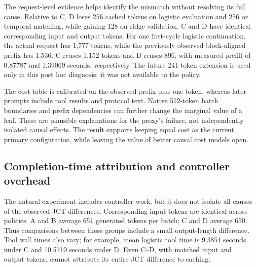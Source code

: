 \documentclass[sigconf, screen, review, balance=false]{acmart}
\begin{document}
The request-level evidence helps identify the mismatch without resolving
its full cause. Relative to C, D loses 256 cached tokens on logistic
evaluation and 256 on temporal matching, while gaining 128 on ridge
validation. C and D have identical corresponding input and output
tokens. For one first-cycle logistic continuation, the actual request
has 1,777 tokens, while the previously observed block-aligned prefix has
1,536. C reuses 1,152 tokens and D reuses 896, with measured prefill of
0.87787 and 1.39069 seconds, respectively. The future 241-token
extension is used only in this post hoc diagnosis; it was not available
to the policy.

The cost table is calibrated on the observed prefix plus one token,
whereas later prompts include tool results and protocol text. Native
512-token batch boundaries and prefix dependencies can further change
the marginal value of a leaf. These are plausible explanations for the
proxy's failure, not independently isolated causal effects. The result
supports keeping equal cost as the current primary configuration, while
leaving the value of better causal cost models open.

\subsection{Completion-time attribution and controller
overhead}\label{completion-time-attribution-and-controller-overhead}

The natural experiment includes controller work, but it does not isolate
all causes of the observed JCT differences. Corresponding input tokens
are identical across policies. A and B average 651 generated tokens per
batch; C and D average 650. Thus comparisons between these groups
include a small output-length difference. Tool wall times also vary; for
example, mean logistic tool time is 9.3854 seconds under C and 10.5710
seconds under D. Even C--D, with matched input and output tokens, cannot
attribute its entire JCT difference to caching.
\end{document}
